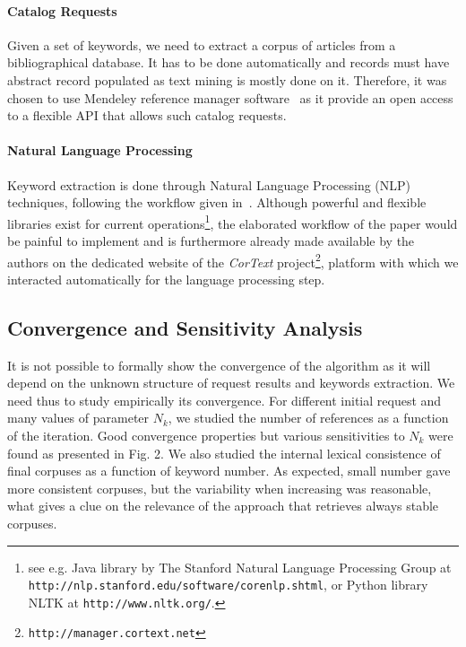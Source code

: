 \paragraph{Catalog Requests}
Given a set of keywords, we need to extract a corpus of articles from a bibliographical database. It has to be done automatically and records must have abstract record populated as text mining is mostly done on it. Therefore, it was chosen to use Mendeley reference manager software~\cite{mendeley} as it provide an open access to a flexible API that allows such catalog requests.


\paragraph{Natural Language Processing}
Keyword extraction is done through Natural Language Processing (NLP) techniques, following the workflow given in~\cite{chavalarias2013phylomemetic}. Although powerful and flexible libraries exist for current operations\footnote{see e.g. Java library by The Stanford Natural Language Processing Group at \texttt{http://nlp.stanford.edu/software/corenlp.shtml}, or Python library NLTK at \texttt{http://www.nltk.org/}.}, the elaborated workflow of the paper would be painful to implement and is furthermore already made available by the authors on the dedicated website of the \emph{CorText} project\footnote{\texttt{http://manager.cortext.net}}, platform with which we interacted automatically for the language processing step.


\subsection{Convergence and Sensitivity Analysis}

It is not possible to formally show the convergence of the algorithm as it will depend on the unknown structure of request results and keywords extraction. We need thus to study empirically its convergence. For different initial request and many values of parameter $N_k$, we studied the number of references as a function of the iteration. Good convergence properties but various sensitivities to $N_k$ were found as presented in Fig. 2. We also studied the internal lexical consistence of final corpuses as a function of keyword number. As expected, small number gave more consistent corpuses, but the variability when increasing was reasonable, what gives a clue on the relevance of the approach that retrieves always stable corpuses.


